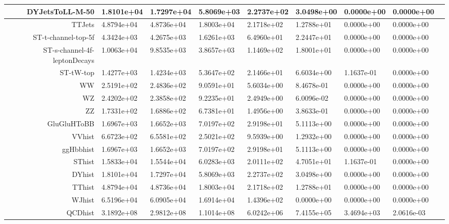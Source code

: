 \begin{landscape}
\begin{table}[htb]
\begin{tabular}{rllllllll}
 \hline 
DYJetsToLL-M-50&1.8101e+04&1.7297e+04&5.8069e+03&2.2737e+02&3.0498e+00&0.0000e+00&0.0000e+00 \\
 \hline 
TTJets&4.8794e+04&4.8736e+04&1.8003e+04&2.1718e+02&1.2788e+01&0.0000e+00&0.0000e+00\\
 \hline 
ST-t-channel-top-5f&4.3424e+03&4.2675e+03&1.6261e+03&6.4960e+01&2.2447e+01&0.0000e+00&0.0000e+00\\
 \hline 
ST-s-channel-4f-leptonDecays&1.0063e+04&9.8535e+03&3.8657e+03&1.1469e+02&1.8001e+01&0.0000e+00&0.0000e+00\\
 \hline 
ST-tW-top&1.4277e+03&1.4234e+03&5.3647e+02&2.1466e+01&6.6034e+00&1.1637e-01&0.0000e+00\\
 \hline 
WW&2.5191e+02&2.4836e+02&9.0591e+01&5.6034e+00&8.4678e-01&0.0000e+00&0.0000e+00\\
 \hline 
WZ&2.4202e+02&2.3858e+02&9.2235e+01&2.4949e+00&6.0096e-02&0.0000e+00&0.0000e+00\\
 \hline 
ZZ&1.7331e+02&1.6886e+02&6.7381e+01&1.4956e+00&3.8633e-01&0.0000e+00&0.0000e+00\\
 \hline 
GluGluHToBB&1.6967e+03&1.6652e+03&7.0197e+02&2.9198e+01&5.1113e+00&0.0000e+00&0.0000e+00\\
 \hline 
VVhist&6.6723e+02&6.5581e+02&2.5021e+02&9.5939e+00&1.2932e+00&0.0000e+00&0.0000e+00 \\
 \hline 
ggHbbhist&1.6967e+03&1.6652e+03&7.0197e+02&2.9198e+01&5.1113e+00&0.0000e+00&0.0000e+00 \\
 \hline 
SThist&1.5833e+04&1.5544e+04&6.0283e+03&2.0111e+02&4.7051e+01&1.1637e-01&0.0000e+00\\
 \hline 
DYhist&1.8101e+04&1.7297e+04&5.8069e+03&2.2737e+02&3.0498e+00&0.0000e+00&0.0000e+00\\
 \hline 
TThist&4.8794e+04&4.8736e+04&1.8003e+04&2.1718e+02&1.2788e+01&0.0000e+00&0.0000e+00\\
 \hline 
WJhist&6.5196e+04&6.0905e+04&1.6914e+04&1.4396e+02&0.0000e+00&0.0000e+00&0.0000e+00\\
 \hline 
QCDhist&3.1892e+08&2.9812e+08&1.1014e+08&6.0242e+06&7.4155e+05&3.4694e+03&2.0616e-03\\
\end{tabular}
\label{tab:cutfl}
\centering
\end{table}
\end{landscape}



